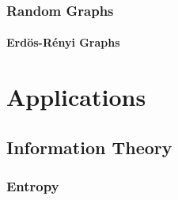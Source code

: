 \documentclass[11pt]{report} %
\begin{document}
\section{Random Graphs}

\subsection{Erd\"{o}s-R\'{e}nyi Graphs}

\part{Applications}

\chapter{Information Theory}

\section{Entropy}
\end{document}
